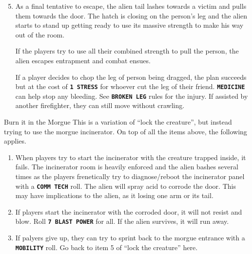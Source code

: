 \clearpage

\begin{rpg-commentbox}{}
\begin{enumerate}
   \setcounter{enumi}{4}
   \item As a final tentative to escape, the alien tail lashes towards a victim and pulls them towards the door. The hatch is closing on the person's leg and the alien starts to stand up getting ready to use its massive strength to make his way out of the room.
   
   If the players try to use all their combined strength to pull the person, the alien escapes entrapment and combat ensues. 

   If a player decides to chop the leg of person being dragged, the plan succeeds but at the cost of \texttt{\textbf{1 STRESS}} for whoever cut the leg of their friend.  \texttt{\textbf{MEDICINE}} can help stop any bleeding.     
   See \texttt{\textbf{BROKEN LEG}} rules for the injury. If assisted by another firefighter, they can still move without crawling. 
\end{enumerate}
\end{rpg-commentbox}

\newsect

\begin{rpg-commentbox}{Burn it in the Morgue}
   This is a variation of ``lock the creature'', but instead trying to use the morgue incinerator. On top of all the items above, the following applies.

   \begin{enumerate}
      \item When players try to start the incinerator with the creature trapped inside, it fails. The incinerator room is heavily enforced and the alien bashes several times as the players frenetically try to diagnose/reboot the incinerator panel with a \texttt{\textbf{COMM TECH}} roll. The alien will spray acid to corrode the door. This may have implications to the alien, as it losing one arm or its tail. 
      
      \item If players start the incinerator with the corroded door, it will not resist and blow. Roll   \texttt{\textbf{7 BLAST POWER}} for all. If the alien survives, it will run away.

      \item If palyers give up, they can try to sprint back to the morgue entrance with a \texttt{\textbf{MOBILITY}} roll. Go back to item 5 of ``lock the creature'' here.
      
   \end{enumerate}
\end{rpg-commentbox}   



